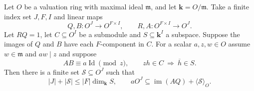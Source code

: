 \begin{lemma}
\label{lem:a-near-inverse-few-generators}
\emitthmsource
Let $O$ be a valuation ring with maximal ideal $\mathfrak m$, and let $\mathbf k=O/\mathfrak m$. Take a finite index set $J,F,I$ and linear maps
\[
 Q,B:O^J\longrightarrow O^{F\times I},
 \qquad R,A:O^{F\times I}\longrightarrow O^J .
\]
Let $RQ=1$, let $C\subseteq O^I$ be a submodule and $S\subseteq\mathbf k^I$ a subspace. Suppose the images of $Q$ and $B$ have each $F$-component in $C$. For a scalar $a,z,w\in O$ assume $w\in\mathfrak m$ and $aw\mid z$ and suppose
\[
 AB\equiv a\operatorname{Id}\pmod z,\qquad
 zh\in C\ \Longrightarrow\ \overline h\in S .
\]
Then there is a finite set $\mathcal S\subseteq O^J$ such that
\[
 |J|+|\mathcal S|\le |F|\dim_\mathbf kS,\qquad
 aO^J\subseteq \operatorname{im}(AQ)+\langle\mathcal S\rangle_O .
\]
\end{lemma}
